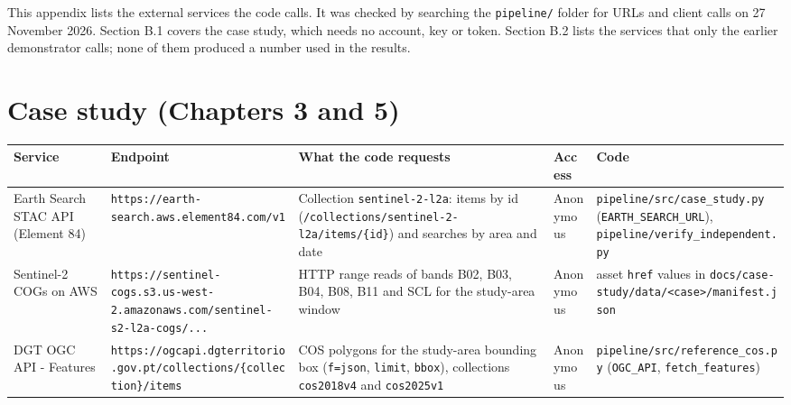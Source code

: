 

This appendix lists the external services the code calls. It was checked by searching the \texttt{pipeline/\allowbreak{}} folder for URLs and client calls on 27 November 2026. Section B.1 covers the case study, which needs no account, key or token. Section B.2 lists the services that only the earlier demonstrator calls; none of them produced a number used in the results.

\section{Case study (Chapters 3 and 5)}

{\small
\begin{longtable}{>{\raggedright\arraybackslash}p{1.99cm}>{\raggedright\arraybackslash}p{3.22cm}>{\raggedright\arraybackslash}p{3.22cm}>{\raggedright\arraybackslash}p{1.34cm}>{\raggedright\arraybackslash}p{3.22cm}}
\toprule
Service & Endpoint & What the code requests & Access & Code \\
\midrule
\endhead
Earth Search STAC API (Element 84) & \texttt{https:/\allowbreak{}/\allowbreak{}earth-search.aws.element84.com/\allowbreak{}v1} & Collection \texttt{sentinel-2-l2a}: items by id (\texttt{/\allowbreak{}collections/\allowbreak{}sentinel-2-l2a/\allowbreak{}items/\allowbreak{}\{id\}}) and searches by area and date & Anonymous & \texttt{pipeline/\allowbreak{}src/\allowbreak{}case\_study.py} (\texttt{EARTH\_SEARCH\_URL}), \texttt{pipeline/\allowbreak{}verify\_independent.py} \\
Sentinel-2 COGs on AWS & \texttt{https:/\allowbreak{}/\allowbreak{}sentinel-cogs.s3.us-west-2.amazonaws.com/\allowbreak{}sentinel-s2-l2a-cogs/\allowbreak{}...} & HTTP range reads of bands B02, B03, B04, B08, B11 and SCL for the study-area window & Anonymous & asset \texttt{href} values in \texttt{docs/\allowbreak{}case-study/\allowbreak{}data/\allowbreak{}<case>/\allowbreak{}manifest.json} \\
DGT OGC API - Features & \texttt{https:/\allowbreak{}/\allowbreak{}ogcapi.dgterritorio.gov.pt/\allowbreak{}collections/\allowbreak{}\{collection\}/\allowbreak{}items} & COS polygons for the study-area bounding box (\texttt{f=json}, \texttt{limit}, \texttt{bbox}), collections \texttt{cos2018v4} and \texttt{cos2025v1} & Anonymous & \texttt{pipeline/\allowbreak{}src/\allowbreak{}reference\_cos.py} (\texttt{OGC\_API}, \texttt{fetch\_features}) \\

\end{longtable}}
